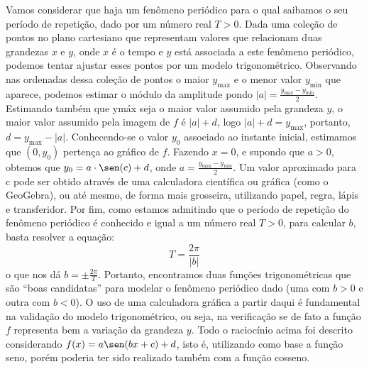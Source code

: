 Vamos considerar que haja um fenômeno periódico para o qual saibamos o seu período de repetição, dado por um número real $T > 0$. Dada uma coleção de pontos no plano cartesiano que representam valores que relacionam duas grandezas $x$ e $y$, onde $x$ é o tempo e $y$ está associada a este fenômeno periódico, podemos tentar ajustar esses pontos por um modelo trigonométrico. Observando nas ordenadas dessa coleção de pontos o maior $y_{\max}$ e o menor valor $y_{\min}$ que aparece, podemos estimar o módulo da amplitude pondo $|a| = \frac{y_{\max}-y_{\min}}{2}$. Estimando também que ymáx seja o maior valor assumido pela grandeza $y$, o maior valor assumido pela imagem de $f$ é $|a|+d$, logo $|a|+d=y_{\max}$, portanto, $d = y_{\max} -|a|$. Conhecendo-se o valor $y_0$ associado ao instante inicial, estimamos que $(0,y_0)$ pertença ao gráfico de $f$. Fazendo $x = 0$, e supondo que $a > 0$, obtemos que $y_0 = a\cdot\sen(c)+d$, onde $a=\frac{y_{\max}-y_{\min}}{2}$. Um valor aproximado para c pode ser obtido através de uma calculadora científica ou gráfica (como o GeoGebra), ou até mesmo, de forma mais grosseira, utilizando papel, regra, lápis e transferidor. Por fim, como estamos admitindo que o período de repetição do fenômeno periódico é conhecido e igual a um número real $T > 0$, para calcular $b$, basta resolver a equação:
\begin{equation*}
T =\frac{2\pi}{|b|} 
\end{equation*}
o que nos dá $b = \pm\frac{2\pi}{T}$. Portanto, encontramos duas funções trigonométricas que são “boas candidatas”{} para modelar o fenômeno periódico dado (uma com $b > 0$ e outra com $b < 0$). O uso de uma calculadora gráfica a partir daqui é fundamental na validação do modelo trigonométrico, ou seja, na verificação se de fato a função $f$ representa bem a variação da grandeza $y$.
Todo o raciocínio acima foi descrito considerando $f(x)= a\sen(bx+c) + d$, isto é, utilizando como base a função seno, porém poderia ter sido realizado também com a função cosseno.


